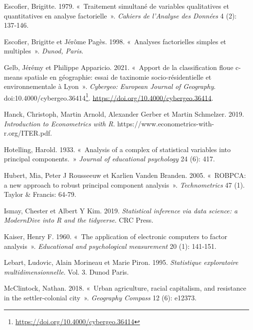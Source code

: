 \documentclass[
  11pt,
  french,
]{book}
\renewcommand{\href}[2]{#2\footnote{\url{#1}}}
\begin{document}
\leavevmode\hypertarget{ref-escofier1979traitement}{}%
Escofier, Brigitte. 1979. «~Traitement simultané de variables qualitatives et quantitatives en analyse factorielle~». \emph{Cahiers de l'Analyse des Données} 4 (2): 137‑146.

\leavevmode\hypertarget{ref-escofier1998analyses}{}%
Escofier, Brigitte et Jérôme Pagès. 1998. «~Analyses factorielles simples et multiples~». \emph{Dunod, Paris}.

\leavevmode\hypertarget{ref-2021_4}{}%
Gelb, Jérémy et Philippe Apparicio. 2021. «~Apport de la classification floue c-means spatiale en géographie: essai de taxinomie socio-résidentielle et environnementale à Lyon~». \emph{Cybergeo: European Journal of Geography}. doi:\href{https://doi.org/10.4000/cybergeo.36414}{10.4000/cybergeo.36414}. \url{https://doi.org/10.4000/cybergeo.36414}.

\leavevmode\hypertarget{ref-hanck2019introduction}{}%
Hanck, Christoph, Martin Arnold, Alexander Gerber et Martin Schmelzer. 2019. \emph{Introduction to Econometrics with R}. https://www.econometrics-with-r.org/ITER.pdf.

\leavevmode\hypertarget{ref-hotelling1933analysis}{}%
Hotelling, Harold. 1933. «~Analysis of a complex of statistical variables into principal components.~» \emph{Journal of educational psychology} 24 (6): 417.

\leavevmode\hypertarget{ref-hubert2005robpca}{}%
Hubert, Mia, Peter J Rousseeuw et Karlien Vanden Branden. 2005. «~ROBPCA: a new approach to robust principal component analysis~». \emph{Technometrics} 47 (1). Taylor \& Francis: 64‑79.

\leavevmode\hypertarget{ref-ismay2019statistical}{}%
Ismay, Chester et Albert Y Kim. 2019. \emph{Statistical inference via data science: a ModernDive into R and the tidyverse}. CRC Press.

\leavevmode\hypertarget{ref-kaiser1960application}{}%
Kaiser, Henry F. 1960. «~The application of electronic computers to factor analysis~». \emph{Educational and psychological measurement} 20 (1): 141‑151.

\leavevmode\hypertarget{ref-lebart1995statistique}{}%
Lebart, Ludovic, Alain Morineau et Marie Piron. 1995. \emph{Statistique exploratoire multidimensionnelle}. Vol. 3. Dunod Paris.

\leavevmode\hypertarget{ref-mcclintock2018urban}{}%
McClintock, Nathan. 2018. «~Urban agriculture, racial capitalism, and resistance in the settler-colonial city~». \emph{Geography Compass} 12 (6): e12373.
\end{document}
